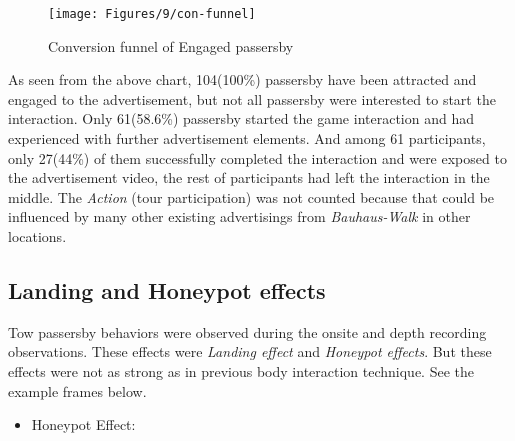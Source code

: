 \begin{figure}[H]
    \centering
    \texttt{[image: Figures/9/con-funnel]}
    \caption{Conversion funnel of Engaged passersby}%
    \label{fig:bodyengagedpasserbypercentage}%
\end{figure}


As seen from the above chart, 104(100\%) passersby have been attracted and engaged to the advertisement, but not all passersby were interested to start the interaction. Only 61(58.6\%) passersby started the game interaction and had experienced with further advertisement elements. And among 61 participants, only 27(44\%) of them successfully completed the interaction and were exposed to the advertisement video, the rest of participants had left the interaction in the middle. The \emph{Action} (tour participation) was not counted because that could be influenced by many other existing advertisings from \emph{Bauhaus-Walk} in other locations.



\subsection{Landing and Honeypot effects}
Tow passersby behaviors were observed during the onsite and depth recording observations. These effects were \emph{Landing effect}\cite{LookingGlass} and \emph{Honeypot effects}\cite{EnticingPeople}. But these effects were not as strong as in previous body interaction technique. See the example frames below.



\begin{itemize}


\item Honeypot Effect:

\end{itemize}


